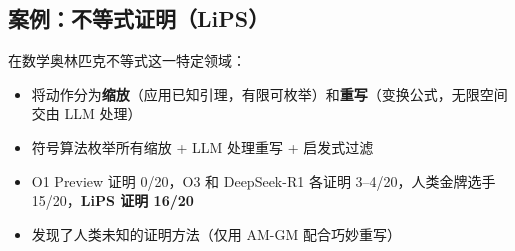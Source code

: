 \subsection{案例：不等式证明（LiPS）}

在数学奥林匹克不等式这一特定领域：
\begin{itemize}
    \item 将动作分为\textbf{缩放}（应用已知引理，有限可枚举）和\textbf{重写}（变换公式，无限空间交由 LLM 处理）
    \item 符号算法枚举所有缩放 + LLM 处理重写 + 启发式过滤
    \item O1 Preview 证明 0/20，O3 和 DeepSeek-R1 各证明 3--4/20，人类金牌选手 15/20，\textbf{LiPS 证明 16/20}
    \item 发现了人类未知的证明方法（仅用 AM-GM 配合巧妙重写）
\end{itemize}

